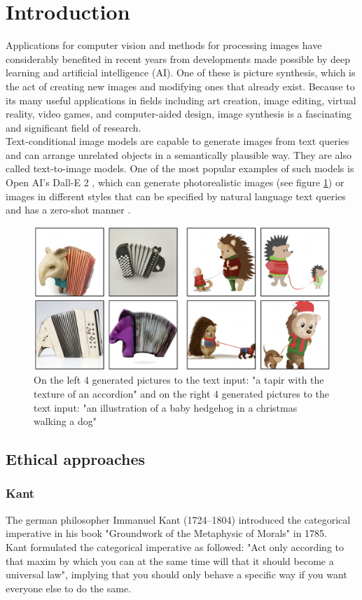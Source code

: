 \documentclass[11pt]{article}
\begin{document}
\section{Introduction}
Applications for computer vision and methods for processing images have considerably benefited in recent years from developments made possible by deep learning and artificial intelligence (AI). One of these is picture synthesis, which is the act of creating new images and modifying ones that already exist. Because to its many useful applications in fields including art creation, image editing, virtual reality, video games, and computer-aided design, image synthesis is a fascinating and significant field of research.\\
Text-conditional image models are capable to generate images from text queries and can arrange unrelated objects in a semantically plausible way. They are also called text-to-image models.
One of the most popular examples of such models is Open AI's Dall-E 2 \cite{DallE}, which can generate photorealistic images (see figure \ref{example}) or images in different styles that can be specified by natural language text queries and has a zero-shot manner \cite{zeroShot}.

\begin{figure} [h]
	\includegraphics[width = 1\linewidth]{images/DallEExample.png}
	\caption{On the left 4 generated pictures to the text input: "a tapir with the texture of an accordion" and on the right 4 generated pictures to the text input: "an illustration of a baby hedgehog in a christmas walking a dog" \cite{zeroShot}}
	\label{example}
\end{figure}

\subsection{Ethical approaches}

\subsubsection{Kant}
The german philosopher Immanuel Kant (1724--1804) introduced the categorical imperative in his book "Groundwork of the Metaphysic of Morals" in 1785. \\
Kant formulated the categorical imperative as followed: "Act only according to that maxim by which you can at the same time will that it should become a universal law", implying that you should only behave a specific way if you want everyone else to do the same.
\end{document}
